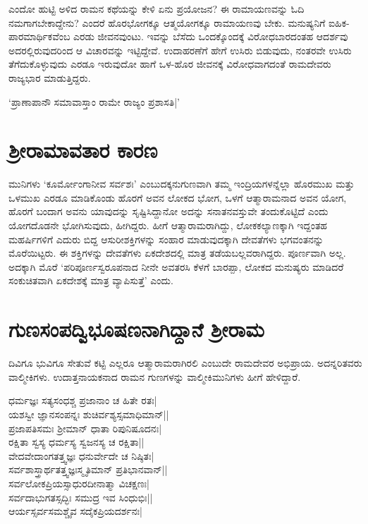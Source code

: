 ಎಂದೋ ಹುಟ್ಟಿ ಅಳಿದ ರಾಮನ ಕಥೆಯನ್ನು ಕೇಳಿ ಏನು ಪ್ರಯೋಜನ? ಈ ರಾಮಾಯಣವನ್ನು ಓದಿ ನಮಗಾಗಬೇಕಾದ್ದೇನು? ಎಂದರೆ ಹೊರಭೋಗಕ್ಕೂ ಆತ್ಮಯೋಗಕ್ಕೂ ರಾಮಾಯಣವು ಬೇಕು. ಮನುಷ್ಯನಿಗೆ ಐಹಿಕ-ಪಾರಮಾರ್ಥಿಕವೆಂಬ ಎರಡು ಜೀವನವುಂಟು. ಇವನ್ನು ಬೆಸೆದು ಒಂದಕ್ಕೊಂದಕ್ಕೆ ವಿರೋಧಬಾರದಂತಹ ಆದರ್ಶವು ಅದರಲ್ಲಿರುವುದರಿಂದ ಆ‌ ವಿಚಾರವನ್ನು ಇಟ್ಟಿದ್ದೇವೆ. ಉದಾಹರಣೆಗೆ ಹೇಗೆ ಉಸಿರು ಬಿಡುವುದು, ನಂತರವೇ ಉಸಿರು ತೆಗೆದುಕೊಳ್ಳುವುದು ಎರಡೂ ಇರುವುದೋ ಹಾಗೆ ಒಳ-ಹೊರ ಜೀವನಕ್ಕೆ ವಿರೋಧವಾಗದಂತೆ ರಾಮದೇವರು ರಾಜ್ಯಭಾರ ಮಾಡುತ್ತಿದ್ದರು.

\begin{shloka}
`ಪ್ರಾಣಾಪಾನೌ ಸಮಾವಾಸ್ತಾಂ ರಾಮೇ ರಾಜ್ಯಂ ಪ್ರಶಾಸತಿ|'
\end{shloka}

\section*{ಶ್ರೀರಾಮಾವತಾರ ಕಾರಣ}

ಮುನಿಗಳು `ಕೂರ್ಮೋಂಗಾನೀವ ಸರ್ವಶಃ'\label{222} ಎಂಬುದಕ್ಕನುಗುಣವಾಗಿ ತಮ್ಮ ಇಂದ್ರಿಯಗಳನ್ನೆಲ್ಲಾ ಹೊರಮುಖ ಮತ್ತು ಒಳಮುಖ ಎರಡೂ ಮಾಡಿಕೊಂಡು ಹೊರಗೆ ಅವನ ಲೋಕದ ಭೋಗ, ಒಳಗೆ ಆತ್ಮಾರಾಮನಾದ ಅವನ ಯೋಗ, ಹೊರಗೆ ಬಂದಾಗ ಅವನು ಯಾವುದನ್ನು ಸೃಷ್ಟಿಸಿದ್ದಾನೋ ಅದನ್ನು ಸನಾತನವಸ್ತುವೇ ತಂದುಕೊಟ್ಟಿದೆ ಎಂದು ಯೋಗದೊಡನೇ ಭೋಗಿಸುವುದು, ಹೀಗಿದ್ದರು. ಹೀಗೆ ಆತ್ಮಾರಾಮರಾಗಿದ್ದು, ಲೋಕಕಲ್ಯಾಣಕ್ಕಾಗಿ ಇದ್ದಂತಹ ಮಹರ್ಷಿಗಳಿಗೆ ಎದುರು ಬಿದ್ದ ಆಸುರೀಶಕ್ತಿಗಳನ್ನು ಸಂಹಾರ ಮಾಡುವುದಕ್ಕಾಗಿ ದೇವತೆಗಳು ಭಗವಂತನನ್ನು ಮೊರೆಯಿಟ್ಟರು. ಈ ಶಕ್ತಿಗಳನ್ನು ದೇವತೆಗಳು ಏಕದೇಶದಲ್ಲಿ ಮಾತ್ರ ತಡೆಯಬಲ್ಲವರಾಗಿದ್ದರು. ಪೂರ್ಣವಾಗಿ ಅಲ್ಲ. ಅದಕ್ಕಾಗಿ ಮೊರೆ `ಪರಿಪೂರ್ಣಸ್ವರೂಪನಾದ ನೀನೇ ಅವತರಸಿ ಕೆಳಗೆ ಬಾರಪ್ಪಾ, ಲೋಕದ ಮನುಷ್ಯರು ಮಾಡಿದರೆ ಸಂಕುಚಿತವಾಗಿ ಏಕದೇಶಕ್ಕೆ ಮಾತ್ರ ವ್ಯಾಪಿಸುತ್ತೆ' ಎಂದು.

\section*{ಗುಣಸಂಪದ್ವಿಭೂಷಣನಾಗಿದ್ದಾನೆ ಶ್ರೀರಾಮ}

ದಿವಿಗೂ ಭುವಿಗೂ ಸೇತುವೆ ಕಟ್ಟಿ ಎಲ್ಲರೂ ಆತ್ಮಾರಾಮರಾಗಿರಲಿ ಎಂಬುದೇ ರಾಮದೇವರ ಅಭಿಪ್ರಾಯ. ಅದನ್ನರಿತವರು ವಾಲ್ಮೀಕಿಗಳು. ಉದಾತ್ತನಾಯಕನಾದ ರಾಮನ ಗುಣಗಳನ್ನು ವಾಲ್ಮೀಕಿಮುನಿಗಳು ಹೀಗೆ ಹೇಳಿದ್ದಾರೆ.

\begin{shloka}
ಧರ್ಮಜ್ಞಃ ಸತ್ಯಸಂಧಶ್ಚ ಪ್ರಜಾನಾಂ ಚ ಹಿತೇ ರತಃ|\label{223}\\
ಯಶಸ್ವೀ ಜ್ಞಾನಸಂಪನ್ನಃ ಶುಚಿರ್ವಶ್ಯಸ್ಸಮಾಧಿಮಾನ್||\\
ಪ್ರಜಾಪತಿಸಮಃ ಶ್ರೀಮಾನ್ ಧಾತಾ ರಿಪುನಿಷೂದನಃ|\\
ರಕ್ಷಿತಾ ಸ್ವಸ್ಯ ಧರ್ಮಸ್ಯ ಸ್ವಜನಸ್ಯ ಚ ರಕ್ಷಿತಾ||\\
ವೇದವೇದಾಂಗತತ್ತ್ವಜ್ಞಃ ಧನುರ್ವೇದೇ ಚ ನಿಷ್ಠಿತಃ|\\
ಸರ್ವಶಾಸ್ತ್ರಾರ್ಥತತ್ತ್ವಜ್ಞಃಸ್ಮೃತಿಮಾನ್ ಪ್ರತಿಭಾನವಾನ್||\\
ಸರ್ವಲೋಕಪ್ರಿಯಸ್ಸಾಧುರದೀನಾತ್ಮಾ ವಿಚಕ್ಷಣಃ|\\
ಸರ್ವದಾಭುಗತಸ್ಸದ್ಭಿಃ ಸಮುದ್ರ ಇವ ಸಿಂಧುಭಿಃ||\\
ಆರ್ಯಸ್ಸರ್ವಸಮಶ್ಚೈವ ಸದೈಕಪ್ರಿಯದರ್ಶನಃ|
\end{shloka}

